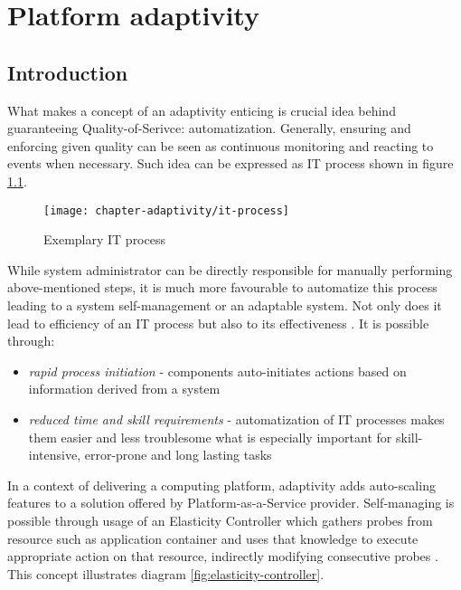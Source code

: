\chapter{Platform adaptivity}


\section{Introduction}
What makes a concept of an adaptivity enticing is crucial idea behind guaranteeing Quality-of-Serivce: automatization. Generally, ensuring and enforcing given quality can be seen as continuous monitoring and reacting to events when necessary. Such idea can be expressed as IT process shown in figure \ref{fig:it-process}.

\begin{figure}[!ht]
  \begin{center}
    \texttt{[image: chapter-adaptivity/it-process]}
  \end{center}
  \caption{Exemplary IT process}
  \label{fig:it-process}
\end{figure}

While system administrator can be directly responsible for manually performing above-mentioned steps, it is much more favourable to automatize this process leading to a system self-management or an adaptable system. Not only does it lead to efficiency of an IT process but also to its effectiveness \cite{IBM06}. It is possible through:
\begin{itemize}
  \item \emph{rapid process initiation} - components auto-initiates actions based on information derived from a system
  \item \emph{reduced time and skill requirements} - automatization of IT processes makes them easier and less troublesome what is especially important for skill-intensive, error-prone and long lasting tasks
\end{itemize}

In a context of delivering a computing platform, adaptivity adds auto-scaling features to a solution offered by Platform-as-a-Service provider. Self-managing is possible through usage of an Elasticity Controller which gathers probes from resource such as application container and uses that knowledge to execute appropriate action on that resource, indirectly modifying consecutive probes \cite{VaRoBu11}. This concept illustrates diagram \ref{fig:elasticity-controller}.

